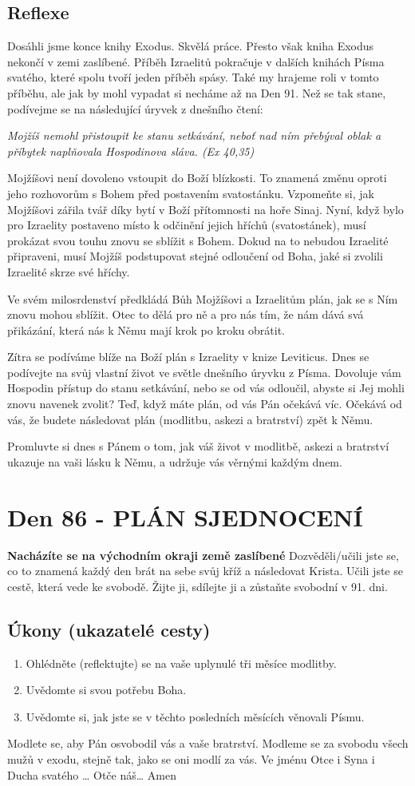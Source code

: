 \documentclass[11pt]{article}
\newcommand{\zacatekTrinactyTyden}{
\textbf{Nacházíte se na východním okraji země zaslíbené} \newline 
Dozvěděli/učili jste se, co to znamená každý den brát na sebe svůj kříž a následovat Krista. Učili jste se cestě, která vede ke svobodě. Žijte ji, sdílejte ji a zůstaňte svobodní v 91. dni.

\subsection*{Úkony (ukazatelé cesty)}
\begin{enumerate}
  \item Ohlédněte (reflektujte) se na vaše uplynulé tři měsíce modlitby.
  \item Uvědomte si svou potřebu Boha.
  \item Uvědomte si, jak jste se v těchto posledních měsících věnovali Písmu.
\end{enumerate}
Modlete se, aby Pán osvobodil vás a vaše bratrství. \newline
Modleme se za svobodu všech mužů v exodu, stejně tak, jako se oni modlí za vás.\newline
Ve jménu Otce i Syna i Ducha svatého …  Otče náš… Amen
}
\begin{document}
\subsection*{Reflexe}
Dosáhli jsme konce knihy Exodus. Skvělá práce. Přesto však kniha Exodus nekončí v zemi zaslíbené. Příběh
Izraelitů pokračuje v dalších knihách Písma svatého, které spolu tvoří jeden příběh spásy. Také my hrajeme
roli v tomto příběhu, ale jak by mohl vypadat si necháme až na Den 91. Než se tak stane, podívejme se na
následující úryvek z dnešního čtení:

\textit{Mojžíš nemohl přistoupit ke stanu setkávání, neboť nad ním přebýval oblak a příbytek naplňovala
Hospodinova sláva. (Ex 40,35)}

Mojžíšovi není dovoleno vstoupit do Boží blízkosti. To znamená změnu oproti jeho rozhovorům s Bohem
před postavením svatostánku. Vzpomeňte si, jak Mojžíšovi zářila tvář díky bytí v Boží přítomnosti na hoře
Sinaj. Nyní, když bylo pro Izraelity postaveno místo k odčinění jejich hříchů (svatostánek), musí prokázat
svou touhu znovu se sblížit s Bohem. Dokud na to nebudou Izraelité připraveni, musí Mojžíš podstupovat
stejné odloučení od Boha, jaké si zvolili Izraelité skrze své hříchy.

Ve svém milosrdenství předkládá Bůh Mojžíšovi a Izraelitům plán, jak se s Ním znovu mohou sblížit. Otec
to dělá pro ně a pro nás tím, že nám dává svá přikázání, která nás k Němu mají krok po kroku obrátit.

Zítra se podíváme blíže na Boží plán s Izraelity v knize Leviticus. Dnes se podívejte na svůj vlastní život ve
světle dnešního úryvku z Písma. Dovoluje vám Hospodin přístup do stanu setkávání, nebo se od vás odloučil,
abyste si Jej mohli znovu navenek zvolit? Teď, když máte plán, od vás Pán očekává víc. Očekává od vás, že
budete následovat plán (modlitbu, askezi a bratrství) zpět k Němu.

Promluvte si dnes s Pánem o tom, jak váš život v modlitbě, askezi a bratrství ukazuje na vaši lásku k Němu, a
udržuje vás věrnými každým dnem.


\newpage
\section{Den 86 - PLÁN SJEDNOCENÍ}
\zacatekTrinactyTyden
\end{document}
